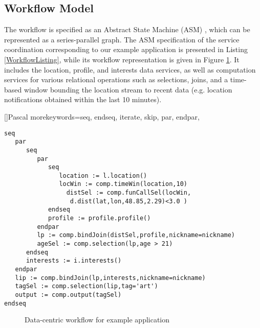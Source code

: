 \subsection{Workflow Model}\label{subsec:workflowModel}

The workflow is specified as an Abstract State Machine (ASM) \cite{Gurevich:1995:EAL:233976.233979}, which can be represented as a series-parallel graph. The ASM specification of the service coordination corresponding to our example application is presented in Listing \ref{WorkflowListing}, while its workflow representation is given in Figure \ref{fig:servCoorExample}. It includes the location, profile, and interests data services, as well as computation services for various relational operations such as selections, joins, and a time-based window bounding the location stream to recent data (e.g. location notifications obtained within the last 10 minutes).

[]{Pascal}{
   morekeywords={seq, endseq, iterate, skip, par, endpar},
}

\lstset{language=AbStM,showstringspaces=false}
\begin{lstlisting}[caption={ASM specification for example application},label=WorkflowListing]
seq
   par
      seq
         par
            seq
               location := l.location()
               locWin := comp.timeWin(location,10)
	             distSel := comp.funCallSel(locWin, 
	              d.dist(lat,lon,48.85,2.29)<3.0 )
            endseq
            profile := profile.profile()
         endpar
         lp := comp.bindJoin(distSel,profile,nickname=nickname)
         ageSel := comp.selection(lp,age > 21)
      endseq
      interests := i.interests()
   endpar
   lip := comp.bindJoin(lp,interests,nickname=nickname)
   tagSel := comp.selection(lip,tag='art')
   output := comp.output(tagSel)
endseq
\end{lstlisting}

\begin{figure}
	\centering
	\caption{Data-centric workflow for example application}
	\label{fig:servCoorExample}
\end{figure}

